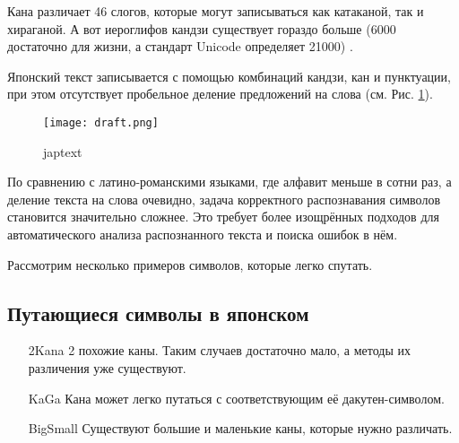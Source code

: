 Кана различает 46 слогов, которые могут записываться как катаканой, так и хираганой. А вот иероглифов кандзи существует гораздо больше (6000 достаточно для жизни, а стандарт Unicode определяет 21000) .

Японский текст записывается с помощью комбинаций кандзи, кан и пунктуации, при этом отсутствует пробельное деление предложений на слова (см. Рис. \ref{fig:japtext_sample}).
	\begin{figure}[H]
	\centering
	\texttt{[image: draft.png]}
	\caption{japtext}
	\label{fig:japtext_sample}
\end{figure}

По сравнению с латино-романскими языками, где алфавит меньше в сотни раз, а деление текста на слова очевидно, задача корректного распознавания символов становится значительно сложнее. Это требует более изощрённых подходов для автоматического анализа распознанного текста и поиска ошибок в нём.

Рассмотрим несколько примеров символов, которые легко спутать.

\subsection{ Путающиеся символы в японском }

\begin{itemize}
	\item[2Kana] 2 похожие каны. Таким случаев достаточно мало, а методы их различения уже существуют.
	\begin{figure}[H]
	\end{figure}

	\item[KaGa] Кана может легко путаться с соответствующим её дакутен-символом.
	\begin{figure}[H]
	\end{figure}

	\item[BigSmall] Существуют большие и маленькие каны, которые нужно различать.
	\begin{figure}[H]
	\end{figure}

	
\end{itemize}

